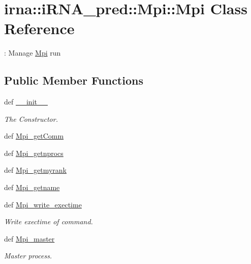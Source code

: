 \hypertarget{classirna_1_1iRNA__pred_1_1Mpi_1_1Mpi}{
\section{irna\-:\-:i\-R\-N\-A\-\_\-pred\-:\-:\-Mpi\-:\-:\-Mpi \-Class \-Reference}
\label{classirna_1_1iRNA__pred_1_1Mpi_1_1Mpi}
}


\-: \-Manage \hyperlink{classirna_1_1iRNA__pred_1_1Mpi_1_1Mpi}{\-Mpi} run  


\subsection*{\-Public \-Member \-Functions}
\begin{DoxyCompactItemize}
\item 
def \hyperlink{classirna_1_1iRNA__pred_1_1Mpi_1_1Mpi_ae9dc463e4f75af927060e0bc96eb0e8e}{\-\_\-\-\_\-init\-\_\-\-\_\-}
\begin{DoxyCompactList}\small\item\em \-The \-Constructor. \end{DoxyCompactList}\item 
def \hyperlink{classirna_1_1iRNA__pred_1_1Mpi_1_1Mpi_aeb7b633f438037269baba5274b7c0e59}{\-Mpi\-\_\-get\-Comm}
\item 
def \hyperlink{classirna_1_1iRNA__pred_1_1Mpi_1_1Mpi_a2815f59e886ef6d602866298c5fe6b33}{\-Mpi\-\_\-getnprocs}
\item 
def \hyperlink{classirna_1_1iRNA__pred_1_1Mpi_1_1Mpi_a155074cc629da31e53c232f27bca03a1}{\-Mpi\-\_\-getmyrank}
\item 
def \hyperlink{classirna_1_1iRNA__pred_1_1Mpi_1_1Mpi_ab797ca8f0b2c7b174ca4e9f5ea68bd96}{\-Mpi\-\_\-getname}
\item 
def \hyperlink{classirna_1_1iRNA__pred_1_1Mpi_1_1Mpi_a11712ec0589085765dcd4647867b1cb5}{\-Mpi\-\_\-write\-\_\-exectime}
\begin{DoxyCompactList}\small\item\em \-Write exectime of command. \end{DoxyCompactList}\item 
def \hyperlink{classirna_1_1iRNA__pred_1_1Mpi_1_1Mpi_a216831dc3b13616f1b88588a6072c9c6}{\-Mpi\-\_\-master}
\begin{DoxyCompactList}\small\item\em \-Master process. \end{DoxyCompactList}\item 

\end{DoxyCompactItemize}
